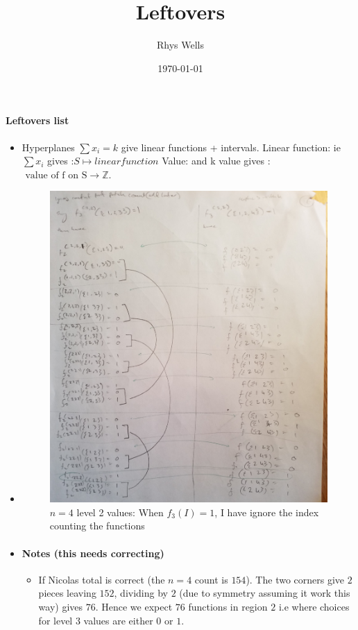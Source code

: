 \documentclass[a4paper,12pt]{article}
\title{Leftovers}
\author{Rhys Wells}
\date{\today}
\theoremstyle{definition}
\theoremstyle{indented}
\newenvironment{titlemize}[1]{%
  \paragraph{#1}
  \begin{itemize}}
  {\end{itemize}}
\begin{document}
\maketitle

\begin{titlemize} {Leftovers list}

  \item Hyperplanes $\sum x_i=k$ give linear functions + intervals. 
      \subitem Linear function: ie $\sum x_i$ gives :$ S \mapsto linear function$ 
       \subitem Value:  and k value gives : $ \text{ value of f on S} \rightarrow \mathbb{Z}$.
       
\item 
\begin{figure}[H]
    \centering
 \includegraphics[scale=0.10,angle=0]{29072020 pics/n4level2.jpg}  
    \caption{$n=4$ level 2 values: When $f_3 (I)=1$, I have ignore the index counting the functions}
    \label{}
\end{figure}
\item 
\begin{titlemize} {Notes (this needs correcting)}
\item 

If Nicolas total is correct (the $n=4$ count is $154$). The two corners give $2$ pieces leaving $152$, dividing by $2$ (due to symmetry assuming it work this way) gives $76$. Hence we expect $76$ functions in region $2$ i.e where choices for level $3$ values are either $0$ or $1$.



\end{titlemize}
\end{titlemize}
\end{document}
